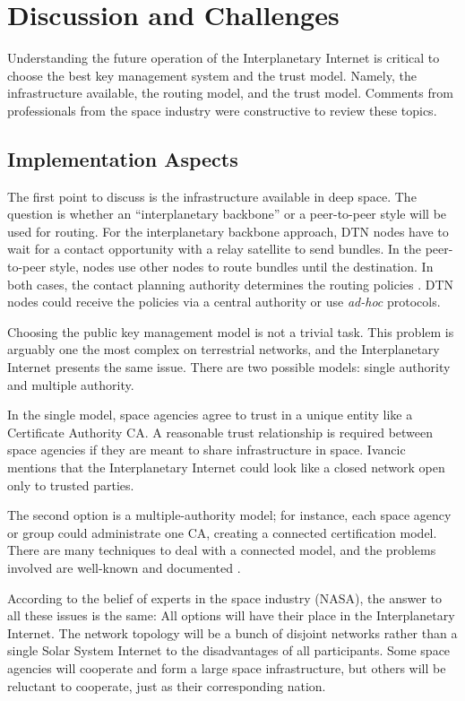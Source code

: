 
\section{Discussion and Challenges}
\label{sec:evaluation}

Understanding the future operation of the Interplanetary Internet is critical to choose the best key management system and the trust model. Namely, the infrastructure available, the routing model, and the trust model. Comments from professionals from the space industry were constructive to review these topics.


\subsection{Implementation Aspects}

The first point to discuss is the infrastructure available in deep space. The question is whether an ``interplanetary backbone'' or a peer-to-peer style will be used for routing. For the interplanetary backbone approach, DTN nodes have to wait for a contact opportunity with a relay satellite to send bundles. In the peer-to-peer style, nodes use other nodes to route bundles until the destination. In both cases, the contact planning authority determines the routing policies \cite{ietf-dtn-bpsec-07,cerf2007delay}. DTN nodes could receive the policies via a central authority or use \textit{ad-hoc} protocols. 

Choosing the public key management model is not a trivial task. This problem is arguably one the most complex on terrestrial networks, and the Interplanetary Internet presents the same issue. There are two possible models: single authority and multiple authority. 

In the single model, space agencies agree to trust in a unique entity like a Certificate Authority CA. A reasonable trust relationship is required between space agencies if they are meant to share infrastructure in space. Ivancic \cite{ivancic2009security} mentions that the Interplanetary Internet could look like a closed network open only to trusted parties. 

The second option is a multiple-authority model; for instance, each space agency or group could administrate one CA, creating a connected certification model. There are many techniques to deal with a connected model, and the problems involved are well-known and documented \cite{al2003certificateless,adams2004pki,gutmann2002pki}. 

According to the belief of experts in the space industry (NASA), the answer to all these issues is the same: All options will have their place in the Interplanetary Internet. The network topology will be a bunch of disjoint networks rather than a single Solar System Internet to the disadvantages of all participants. Some space agencies will cooperate and form a large space infrastructure, but others will be reluctant to cooperate, just as their corresponding nation. 

